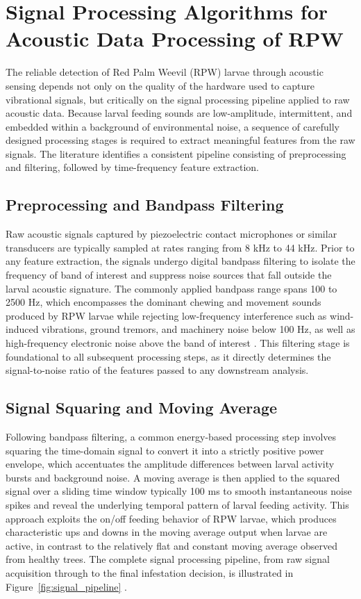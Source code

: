 \documentclass[12pt,a4paper,oneside]{memoir}
\begin{document}
\section{Signal Processing Algorithms for Acoustic Data Processing of RPW}

The reliable detection of Red Palm Weevil (RPW) larvae through acoustic sensing depends not only on the quality of the hardware used to capture vibrational signals, but critically on the signal processing pipeline applied to raw acoustic data. Because larval feeding sounds are low-amplitude, intermittent, and embedded within a background of environmental noise, a sequence of carefully designed processing stages is required to extract meaningful features from the raw signals. The literature identifies a consistent pipeline consisting of preprocessing and filtering, followed by time-frequency feature extraction.

\subsection{Preprocessing and Bandpass Filtering}

Raw acoustic signals captured by piezoelectric contact microphones or similar transducers are typically sampled at rates ranging from 8 kHz to 44 kHz. Prior to any feature extraction, the signals undergo digital bandpass filtering to isolate the frequency of band of interest and suppress noise sources that fall outside the larval acoustic signature. The commonly applied bandpass range spans 100 to 2500 Hz, which encompasses the dominant chewing and movement sounds produced by RPW larvae while rejecting low-frequency interference such as wind-induced vibrations, ground tremors, and machinery noise below 100 Hz, as well as high-frequency electronic noise above the band of interest \cite{pinhas2008,rach2013}. This filtering stage is foundational to all subsequent processing steps, as it directly determines the signal-to-noise ratio of the features passed to any downstream analysis.

\subsection{Signal Squaring and Moving Average}

Following bandpass filtering, a common energy-based processing step involves squaring the time-domain signal to convert it into a strictly positive power envelope, which accentuates the amplitude differences between larval activity bursts and background noise. A moving average is then applied to the squared signal over a sliding time window typically 100 ms to smooth instantaneous noise spikes and reveal the underlying temporal pattern of larval feeding activity. This approach exploits the on/off feeding behavior of RPW larvae, which produces characteristic ups and downs in the moving average output when larvae are active, in contrast to the relatively flat and constant moving average observed from healthy trees. The complete signal processing pipeline, from raw signal acquisition through to the final infestation decision, is illustrated in Figure~\ref{fig:signal_pipeline} \cite{wang2021}.
\end{document}
